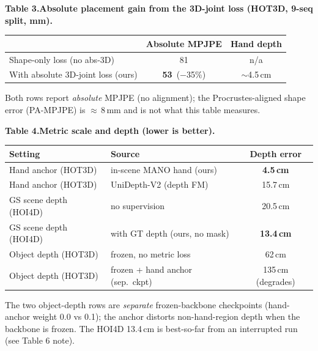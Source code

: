 \documentclass[10pt]{article}
\begin{document}
\vspace{0.3em}
\noindent\textbf{Table 3.\quad Absolute placement gain from the 3D-joint loss (HOT3D, 9-seq split, mm).}
\begin{center}\begin{tabular}{lcc}
\toprule
 & Absolute MPJPE & Hand depth \\
\midrule
Shape-only loss (no abs-3D) & 81 & n/a \\
With absolute 3D-joint loss (ours) & \textbf{53}\ ($-$35\%) & $\sim$4.5\,cm \\
\bottomrule
\end{tabular}\end{center}
{\small\noindent Both rows report \emph{absolute} MPJPE (no alignment); the Procrustes-aligned
shape error (PA-MPJPE) is $\approx$\,8\,mm and is not what this table measures.}

\vspace{0.3em}
\noindent\textbf{Table 4.\quad Metric scale and depth (lower is better).}
\begin{center}\begin{tabular}{llc}
\toprule
Setting & Source & Depth error \\
\midrule
Hand anchor (HOT3D) & in-scene MANO hand (ours) & \textbf{4.5\,cm} \\
Hand anchor (HOT3D) & UniDepth-V2 (depth FM) & 15.7\,cm \\
GS scene depth (HOI4D) & no supervision & 20.5\,cm \\
GS scene depth (HOI4D) & with GT depth (ours, no mask) & \textbf{13.4\,cm} \\
Object depth (HOT3D) & frozen, no metric loss & 62\,cm \\
Object depth (HOT3D) & frozen + hand anchor (sep.\ ckpt) & 135\,cm (degrades) \\
\bottomrule
\end{tabular}\end{center}
{\small\noindent The two object-depth rows are \emph{separate} frozen-backbone checkpoints
(hand-anchor weight 0.0 vs 0.1); the anchor distorts non-hand-region depth when the backbone is frozen.
The HOI4D 13.4\,cm is best-so-far from an interrupted run (see Table 6 note).}
\end{document}
